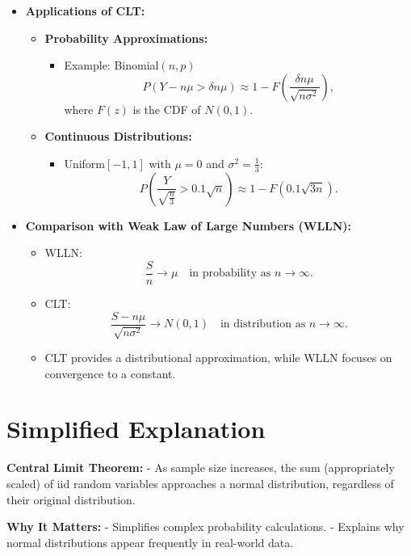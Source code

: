 \documentclass{article}
\begin{document}
\begin{itemize}
  \item \textbf{Applications of CLT:}
    \begin{itemize}
      \item \textbf{Probability Approximations:}
        \begin{itemize}
          \item Example: Binomial$(n, p)$
            \[
              P(Y - n\mu > \delta n\mu) \approx 1 - F\left(\frac{\delta n\mu}{\sqrt{n\sigma^2}}\right),
            \]
            where $F(z)$ is the CDF of $N(0, 1)$.
        \end{itemize}
      \item \textbf{Continuous Distributions:}
        \begin{itemize}
          \item Uniform$[-1, 1]$ with $\mu = 0$ and $\sigma^2 = \frac{1}{3}$:
            \[
              P\left(\frac{Y}{\sqrt{\frac{n}{3}}} > 0.1\sqrt{n}\right) \approx 1 - F(0.1\sqrt{3n}).
            \]
        \end{itemize}
    \end{itemize}

  \item \textbf{Comparison with Weak Law of Large Numbers (WLLN):}
    \begin{itemize}
      \item WLLN:
        \[
          \frac{S}{n} \to \mu \quad \text{in probability as } n \to \infty.
        \]
      \item CLT:
        \[
          \frac{S - n\mu}{\sqrt{n\sigma^2}} \to N(0, 1) \quad \text{in distribution as } n \to \infty.
        \]
      \item CLT provides a distributional approximation, while WLLN focuses on convergence to a constant.
    \end{itemize}
\end{itemize}

\section*{Simplified Explanation}

\textbf{Central Limit Theorem:}
- As sample size increases, the sum (appropriately scaled) of iid random variables approaches a normal distribution, regardless of their original distribution.

\textbf{Why It Matters:}
- Simplifies complex probability calculations.
- Explains why normal distributions appear frequently in real-world data.
\end{document}
